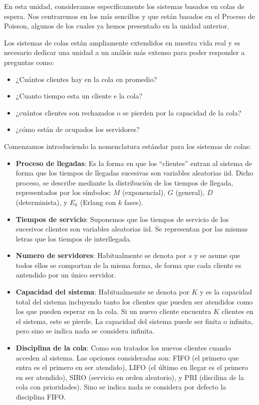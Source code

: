 \documentclass[
]{book}
\providecommand{\tightlist}{%
  \setlength{\itemsep}{0pt}\setlength{\parskip}{0pt}}
\theoremstyle{definition}
\theoremstyle{definition}
\theoremstyle{definition}
\theoremstyle{definition}
\theoremstyle{remark}
\begin{document}
En esta unidad, consideramos especificamente los sistemas basados en colas de espera. Nos centraremos en los más sencillos y que están basados en el Proceso de Poisson, algunos de los cuales ya hemos presentado en la unidad anterior.

Los sistemas de colas están ampliamente extendidos en nuestra vida real y es necesario dedicar una unidad a un análsis
más extenso para poder responder a preguntas como:

\begin{itemize}
\tightlist
\item
  ¿Cuántos clientes hay en la cola en promedio?
\item
  ¿Cuanto tiempo esta un cliente e la cola?
\item
  ¿cuántos clientes son rechazados o se pierden por la capacidad de la cola?
\item
  ¿cómo están de ocupados los servidores?
\end{itemize}

Comenzamos introduciendo la nomenclatura estándar para los sistemas de colas:

\begin{itemize}
\item
  \textbf{Proceso de llegadas}: Es la forma en que los ``clientes'' entran al sistema de forma que los tiempos de llegadas sucesivas son variables aleatorias iid. Dicho proceso, se describe mediante la distribución de los tiempos de llegada, representados por los símbolos: \(M\) (exponencial), \(G\) (general), \(D\) (determinista), y \(E_k\) (Erlang con \(k\) fases).
\item
  \textbf{Tiempos de servicio}: Suponemos que los tiempos de servicio de los sucesivos clientes son variables aleatorias iid. Se representan por las mismas letras que los tiempos de interllegada.
\item
  \textbf{Numero de servidores}: Habitualmente se denota por \(s\) y se asume que todos ellos se comportan de la misma forma, de forma que cada cliente es antendido por un único servidor.
\item
  \textbf{Capacidad del sistema}: Habitualmemte se denota por \(K\) y es la capacidad total del sistema incluyendo tanto los clientes que pueden ser atendidos como los que pueden esperar en la cola. Si un nuevo cliente encuentra \(K\) clientes en el sistema, este se pierde. La capacidad del sistema puede ser finita o infinita, pero sino se indica nada se considera infinita.
\item
  \textbf{Disciplina de la cola}: Como son tratados los nuevos clientes cuando acceden al sistema. Las opciones consideradas son: FIFO (el primero que entra es el primero en ser atendido), LIFO (el último en llegar es el primero en ser atendido), SIRO (servicio en orden aleatorio), y PRI (discilina de la cola con prioridades). Sino se indica nada se considera por defecto la disciplina FIFO.
\end{itemize}
\end{document}
